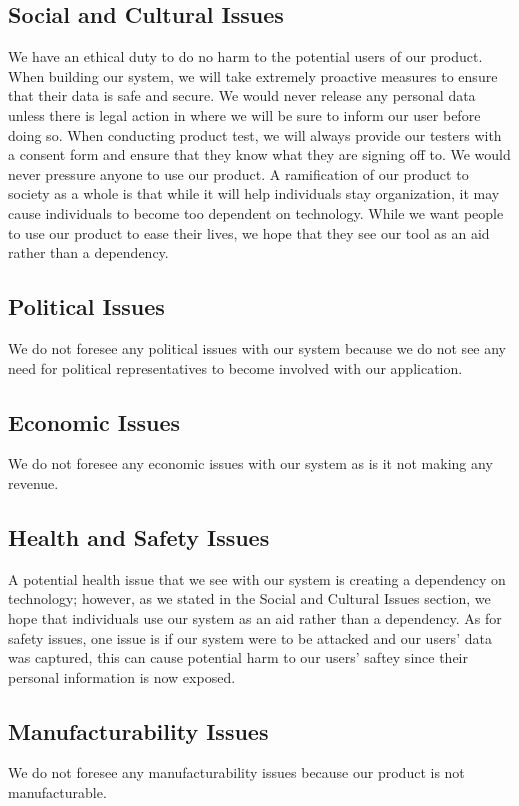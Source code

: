 \subsection{Social and Cultural Issues}
\par We have an ethical duty to do no harm to the potential users of our product. When building our system, we will take extremely proactive measures to ensure that their data is safe and secure. We would never release any personal data unless there is legal action in where we will be sure to inform our user before doing so. When conducting product test, we will always provide our testers with a consent form and ensure that they know what they are signing off to. We would never pressure anyone to use our product. A ramification of our product to society as a whole is that while it will help individuals stay organization, it may cause individuals to become too dependent on technology. While we want people to use our product to ease their lives, we hope that they see our tool as an aid rather than a dependency.
\subsection{Political Issues}
\par We do not foresee any political issues with our system because we do not see any need for political representatives to become involved with our application.
\subsection{Economic Issues}
\par We do not foresee any economic issues with our system as is it not making any revenue. 
\subsection{Health and Safety Issues}
\par A potential health issue that we see with our system is creating a dependency on technology; however, as we stated in the Social and Cultural Issues section, we hope that individuals use our system as an aid rather than a dependency. As for safety issues, one issue is if our system were to be attacked and our users' data was captured, this can cause potential harm to our users' saftey since their personal information is now exposed. 
\subsection{Manufacturability Issues}
\par We do not foresee any manufacturability issues because our product is not manufacturable.
